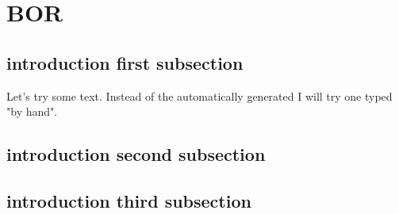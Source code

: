 \documentclass[crop=false]{standalone}
\begin{document}
\section{BOR}

\subsection{introduction first subsection}
Let's try some text. Instead of the automatically generated
I will try one typed "by hand".

\subsection{introduction second subsection}


\subsection{introduction third subsection}

\end{document}
